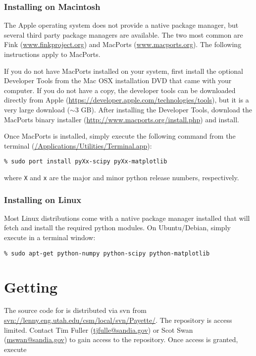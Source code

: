 \documentclass[11pt]{article}
\newcommand{\payette}{{\sc{Payette}}}
\newcommand{\termcommand}[1]{\indent\hspace{.2in}\texttt{\% #1}\newline}
\begin{document}
\subsubsection{Installing on Macintosh}
The Apple operating system does not provide a native package manager, but several
third party package managers are available.  The two most common are Fink
(\url{www.finkproject.org}) and MacPorts (\url{www.macports.org}).  The following
instructions apply to MacPorts.

If you do not have MacPorts installed on your system, first install the optional
Developer Tools from the Mac OSX installation DVD that came with your computer.
If you do not have a copy, the developer tools can be downloaded directly from
Apple (\url{https://developer.apple.com/technologies/tools}), but it is a very
large download ($\sim$3 GB).  After installing the Developer Tools, download the
MacPorts binary installer (\url{http://www.macports.org/install.php}) and
install.

Once MacPorts is installed, simply execute the following command from the
terminal (\url{/Applications/Utilities/Terminal.app}): \newline

\termcommand{sudo port install pyXx-scipy pyXx-matplotlib}

\noindent where \texttt{X} and \texttt{x} are the major and minor python release
numbers, respectively.

\subsubsection{Installing on Linux}
Most Linux distributions come with a native package manager installed that will
fetch and install the required python modules.  On Ubuntu/Debian, simply execute
in a terminal window:\newline

\termcommand{sudo apt-get python-numpy python-scipy python-matplotlib}

\section{Getting \payette{}}
\label{sec:getting}
The source code for \payette{} is distributed via svn from
\url{svn://lenny.eng.utah.edu/csm/local/svn/Payette/}.  The repository is access
limited.  Contact Tim Fuller (\url{tjfulle@sandia.gov}) or Scot Swan
(\url{mswan@sandia.gov}) to gain access to the repository.  Once access is
granted, execute \newline
\end{document}
